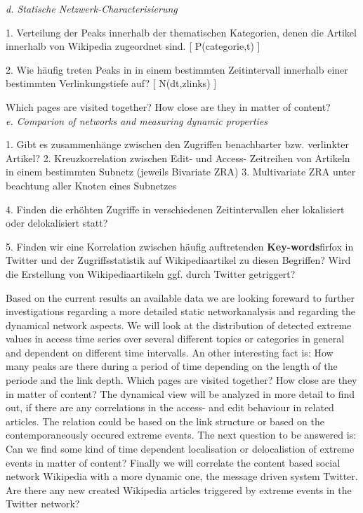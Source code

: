 \documentclass[a4paper,10pt]{scrbook}
\begin{document}
\textit{d. Statische Netzwerk-Characterisierung}

1. Verteilung der Peaks innerhalb der thematischen Kategorien, denen die Artikel 
innerhalb von Wikipedia zugeordnet sind. [ P(categorie,t) ]

2. Wie häufig treten Peaks in in einem bestimmten Zeitintervall innerhalb einer 
bestimmten Verlinkungstiefe auf? [ N(dt,zlinks) ] 

Which pages are visited together? How close are they in matter of content?\\

\textit{e. Comparion of networks and measuring dynamic properties}

1. Gibt es zusammenhänge zwischen den Zugriffen benachbarter bzw. verlinkter Artikel?
2. Kreuzkorrelation zwischen Edit- und Access- Zeitreihen von Artikeln in einem bestimmten Subnetz (jeweils Bivariate ZRA)
3. Multivariate ZRA unter beachtung aller Knoten eines Subnetzes

4. Finden die erhöhten Zugriffe in verschiedenen Zeitintervallen eher lokalisiert oder delokalisiert statt?

5. Finden wir eine Korrelation zwischen häufig auftretenden \textbf{Key-words}firfox in Twitter und der Zugriffsstatistik auf 
Wikipediaartikel zu diesen Begriffen? Wird die Erstellung von Wikipediaartikeln ggf. durch Twitter getriggert? 

Based on the current results an available data we are looking foreward to further investigations regarding a more 
detailed static networkanalysis and regarding the dynamical network aspects. We will look at the distribution of 
detected extreme values in access time series over several different topics or categories in general and dependent 
on different time intervalls. An other interesting fact is: How many peaks are there during a period of time depending 
on the length of the periode and the link depth. Which pages are visited together? How close are they in matter of content? 
The dynamical view will be analyzed in more detail to find out, if there are any correlations in the access- and 
edit behaviour in related articles. The relation could be based on the link structure or based on the contemporaneously 
occured extreme events. The next question to be answered is: Can we find some kind of time dependent localisation or 
delocalistion of extreme events in matter of content? Finally we will correlate the content based social network 
Wikipedia with a more dynamic one, the message driven system Twitter. Are there any new created Wikipedia articles 
triggered by extreme events in the Twitter network?
\end{document}
